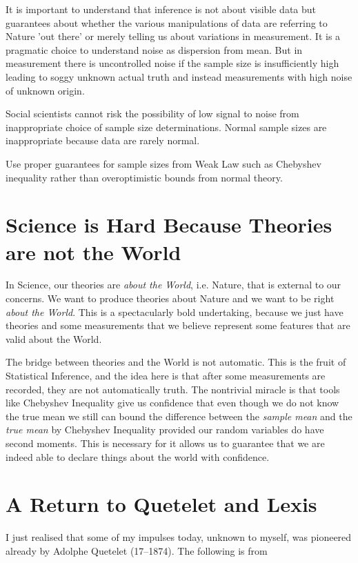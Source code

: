 \documentclass{amsart}
\begin{document}
It is important to understand that inference is not about visible data but guarantees about whether the various manipulations of data are referring to Nature 'out there' or merely telling us about variations in measurement.  It is a pragmatic choice to understand noise as dispersion from mean.  But in measurement there is uncontrolled noise if the sample size is insufficiently high leading to soggy unknown actual truth and instead measurements with high noise of unknown origin.  

Social scientists cannot risk the possibility of low signal to noise from inappropriate choice of sample size determinations.  Normal sample sizes are inappropriate because data are rarely normal. 

Use proper guarantees for sample sizes from Weak Law such as Chebyshev inequality rather than overoptimistic bounds from normal theory.


\section{Science is Hard Because Theories are not the World}

In Science, our theories are {\em about the World}, i.e. Nature, that is external to our concerns.  We want to produce theories about Nature and we want to be right {\em about the World}.  This is a spectacularly bold undertaking, because we just have theories and some measurements that we believe represent some features that are valid about the World.

The bridge between theories and the World is not automatic.  This is the fruit of Statistical Inference, and the idea here is that after some measurements are recorded, they are not automatically truth. The nontrivial miracle is that tools like Chebyshev Inequality give us confidence that even though we do not know the true mean we still can bound the difference between the {\em sample mean} and the {\em true mean} by Chebyshev Inequality provided our random variables do have second moments.  This is necessary for it allows us to guarantee that we are indeed able to declare things about the world with confidence.   

\section{A Return to Quetelet and Lexis}

I just realised that some of my impulses today, unknown to myself, was pioneered already by Adolphe Quetelet (17--1874).  The following is from \cite{QuetWiki}
\end{document}

